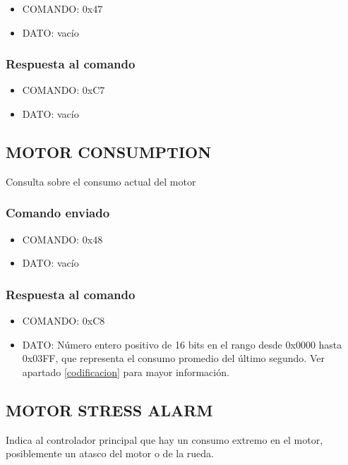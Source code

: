 \documentclass[a4paper,10pt]{article}
\begin{document}
\begin{itemize}
	\item{COMANDO:} 0x47
	\item{DATO:} vac\'io
\end{itemize}

\subsubsection*{Respuesta al comando}

\begin{itemize}
	\item{COMANDO:} 0xC7
	\item{DATO:} vac\'io
\end{itemize}

\subsection{MOTOR CONSUMPTION}
\label{motor_consumption}

Consulta sobre el consumo actual del motor

\subsubsection*{Comando enviado}

\begin{itemize}
	\item{COMANDO:} 0x48
	\item{DATO:} vac\'io
\end{itemize}

\subsubsection*{Respuesta al comando}

\begin{itemize}
	\item{COMANDO:} 0xC8
	\item{DATO:} N\'umero entero positivo de 16 bits en el rango desde 0x0000 hasta 0x03FF, que representa el consumo promedio del \'ultimo segundo.
		Ver apartado \ref{codificacion} para mayor informaci\'on.
\end{itemize}

\subsection{MOTOR STRESS ALARM}
\label{motor_stress_alarm}

Indica al controlador principal que hay un consumo extremo en el motor, posiblemente un atasco del motor o de la rueda.
\end{document}
